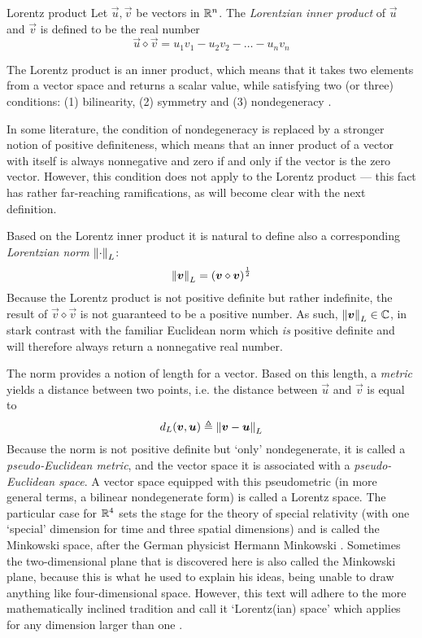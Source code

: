\begin{block}{Lorentz product}
    Let \(\vec{u}, \vec{v}\) be vectors in \(\mathbb{R}^n\). The \emph{Lorentzian inner product} of \(\vec{u}\) and \(\vec{v}\) is defined to be the real number
    \[
     \vec{u} \diamond \vec{v} = u_1v_1 - u_2v_2 - \ldots - u_nv_n
\]
\end{block}
The Lorentz product is an inner product, which means that it takes two elements from a vector space and returns a scalar value, while satisfying two (or three) conditions: (1) bilinearity, (2) symmetry and (3) nondegeneracy \cite{Ratcliffe2019}.

In some literature, the condition of nondegeneracy is replaced by a stronger notion of positive definiteness, which means that an inner product of a vector with itself is always nonnegative and zero if and only if the vector is the zero vector. However, this condition does not apply to the Lorentz product --- this fact has rather far-reaching ramifications, as will become clear with the next definition. 

Based on the Lorentz inner product it is natural to define also a corresponding \emph{Lorentzian norm} \(\norm{\cdot}_L\):
    \[
     \norm{\vb*{v}}_L = \qty(\vb*{v}\diamond\vb*{v})^\frac{1}{2}
\]
Because the Lorentz product is not positive definite but rather indefinite, the result of \(\vec{v}\diamond\vec{v}\) is not guaranteed to be a positive number. As such, \(\norm{\vb*{v}}_L \in \mathbb{C}\), in stark contrast with the familiar Euclidean norm which \emph{is} positive definite and will therefore always return a nonnegative real number.

The norm provides a notion of length for a vector. Based on this length, a \emph{metric} yields a distance between two points, i.e. the distance between \(\vec{u}\) and \(\vec{v}\) is equal to 
\[
     d_L(\vb*{v}, \vb*{u}) \triangleq \norm{\vb*{v} - \vb*{u}}_L
\] 
Because the norm is not positive definite but `only' nondegenerate, it is called a \emph{pseudo-Euclidean metric}, and the vector space it is associated with a \emph{pseudo-Euclidean space}. A vector space equipped with this pseudometric (in more general terms, a bilinear nondegenerate form) is called a Lorentz space. The particular case for \(\mathbb{R}^4\) sets the stage for the theory of special relativity (with one `special' dimension for time and three spatial dimensions) and is called the Minkowski space, after the German physicist Hermann Minkowski \cite{Catoni2008}. Sometimes the two-dimensional plane that is discovered here is also called the Minkowski plane, because this is what he used to explain his ideas, being unable to draw anything like four-dimensional space. However, this text will adhere to the more mathematically inclined tradition and call it `Lorentz(ian) space' which applies for any dimension larger than one \cite{Ratcliffe2019}. 

